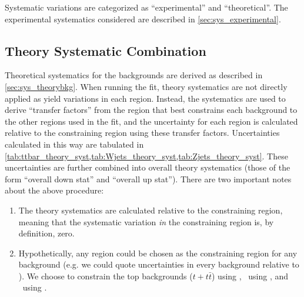 \newcommand{\limitbandexplanation}{Observed limits are given by the solid red line. The dotted red lines indicate the maximum range of the observed exclusion when the signal cross section is varied by $\pm 1 \sigma$. Expected limits are given by the dotted blue line. The yellow band surrounding this line indicates the $1 \sigma$ confidence interval when including all sources of uncertainty listed in \cref{sec:systematics} \emph{except} the signal cross section uncertainty.}

Systematic variations are categorized as ``experimental'' and ``theoretical''.
The experimental systematics considered are described in \cref{sec:sys_experimental}.

\subsection{Theory Systematic Combination}

Theoretical systematics for the backgrounds are derived as described in \cref{sec:sys_theorybkg}. When running the fit, theory systematics are not directly applied as yield variations in each region. Instead, the systematics are used to derive ``transfer factors'' from the region that best constrains each background to the other regions used in the fit, and the uncertainty for each region is calculated {relative to the constraining region} using these transfer factors. Uncertainties calculated in this way are tabulated in \cref{tab:ttbar_theory_syst,tab:Wjets_theory_syst,tab:Zjets_theory_syst}. These uncertainties are further combined into overall theory systematics (those of the form ``overall down stat'' and ``overall up stat''). There are two important notes about the above procedure:
\begin{enumerate}
\item The theory systematics are calculated relative to the constraining region, meaning that the systematic variation {\em in} the constraining region is, by definition, zero.
\item Hypothetically, any region could be chosen as the constraining region for any background (e.g. we could quote uncertainties in every background relative to \crw). We choose to constrain the top backgrounds ($t + t \bar{t}$) using \crt, \wjets\ using \crw, and \zjets\ using \crz.
\end{enumerate}

